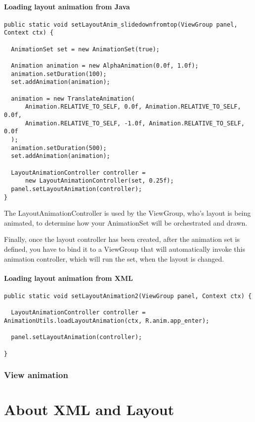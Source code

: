 \documentclass[11pt, a4paper]{book}
\begin{document}
\subsubsection{Loading layout animation from Java}
\begin{verbatim}
public static void setLayoutAnim_slidedownfromtop(ViewGroup panel, Context ctx) {

  AnimationSet set = new AnimationSet(true);

  Animation animation = new AlphaAnimation(0.0f, 1.0f);
  animation.setDuration(100);
  set.addAnimation(animation);

  animation = new TranslateAnimation(
      Animation.RELATIVE_TO_SELF, 0.0f, Animation.RELATIVE_TO_SELF, 0.0f,
      Animation.RELATIVE_TO_SELF, -1.0f, Animation.RELATIVE_TO_SELF, 0.0f
  );
  animation.setDuration(500);
  set.addAnimation(animation);

  LayoutAnimationController controller =
      new LayoutAnimationController(set, 0.25f);
  panel.setLayoutAnimation(controller);
}
\end{verbatim}
The LayoutAnimationController is used by the ViewGroup, who's layout is being
animated, to determine how your AnimationSet will be orchestrated and drawn.

Finally, once the layout controller has been created, after the animation set is
defined, you have to bind it to a ViewGroup that will automatically invoke this
animation controller, which will run the set, when the layout is changed.

\subsubsection{Loading layout animation from XML}
\begin{verbatim}
public static void setLayoutAnimation2(ViewGroup panel, Context ctx) {

  LayoutAnimationController controller = AnimationUtils.loadLayoutAnimation(ctx, R.anim.app_enter);

  panel.setLayoutAnimation(controller);

}
\end{verbatim}
\subsection{View animation}


\chapter{About XML and Layout}
\end{document}
